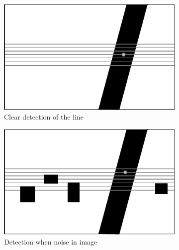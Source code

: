 		\begin{figure}
	        \centering
	        \begin{subfigure}[H]{0.296\textwidth}
	            \includegraphics[width=\textwidth]{figs/mr_camera_processing_1}
	            \caption{Clear detection of the line}
	            \label{fig:mr_camera_processing_1}
	        \end{subfigure}
	        \hspace{20pt}
	        \begin{subfigure}[H]{0.296\textwidth}
	            \includegraphics[width=\textwidth]{figs/mr_camera_processing_2}
	            \caption{Detection when noise in image}
	            \label{fig:mr_camera_processing_2}
	    	\end{subfigure}
	        \hspace{20pt}
	    	\begin{subfigure}[H]{0.296\textwidth}

\end{subfigure}
\end{figure}
